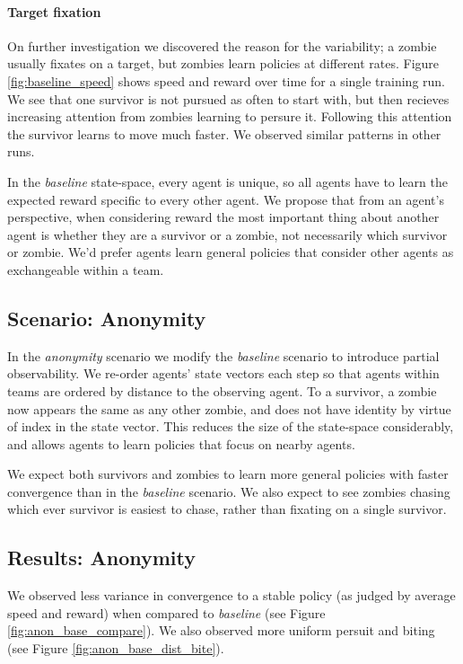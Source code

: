 \documentclass[11pt,a4paper]{article}
\begin{document}
\paragraph{Target fixation} On further investigation we discovered the reason for the variability; a zombie usually fixates on a target, but zombies learn policies at different rates.
Figure \ref{fig:baseline_speed} shows speed and reward over time for a single training run.
We see that one survivor is not pursued as often to start with, but then recieves increasing attention from zombies learning to persure it.
Following this attention the survivor learns to move much faster.
We observed similar patterns in other runs.

In the \emph{baseline} state-space, every agent is unique, so all agents have to learn the expected reward specific to every other agent.
We propose that from an agent's perspective, when considering reward the most important thing about another agent is whether they are a survivor or a zombie, not necessarily which survivor or zombie.
We'd prefer agents learn general policies that consider other agents as exchangeable within a team.

\subsection{Scenario: Anonymity}
\label{sec:anon}

In the \emph{anonymity} scenario we modify the \emph{baseline} scenario to introduce partial observability.
We re-order agents' state vectors each step so that agents within teams are ordered by distance to the observing agent.
To a survivor, a zombie now appears the same as any other zombie, and does not have identity by virtue of index in the state vector.
This reduces the size of the state-space considerably, and allows agents to learn policies that focus on nearby agents.

We expect both survivors and zombies to learn more general policies with faster convergence than in the \emph{baseline} scenario.
We also expect to see zombies chasing which ever survivor is easiest to chase, rather than fixating on a single survivor.

\subsection{Results: Anonymity}

We observed less variance in convergence to a stable policy (as judged by average speed and reward) when compared to \emph{baseline} (see Figure \ref{fig:anon_base_compare}).
We also observed more uniform persuit and biting (see Figure \ref{fig:anon_base_dist_bite}).
\end{document}

